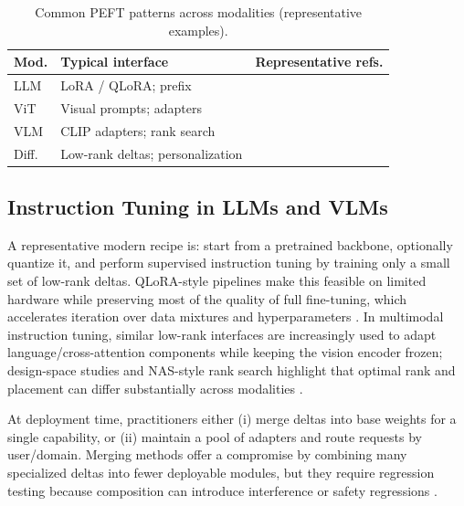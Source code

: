 \documentclass[conference]{IEEEtran}
\begin{document}
\begin{table}[t]
    \centering
    \caption{Common PEFT patterns across modalities (representative examples).}
    \label{tab:peft-modalities}
    \scriptsize
    \setlength{\tabcolsep}{3pt}
    \begin{tabular}{p{0.85cm}p{2.2cm}p{2.4cm}}
        \toprule
        \textbf{Mod.} & \textbf{Typical interface} & \textbf{Representative refs.} \\
        \midrule
        LLM & LoRA / QLoRA; prefix & \cite{hu2021lora,dettmers2023qlora,li2021prefix} \\
        ViT & Visual prompts; adapters & \cite{jia2022visual,chen2022adaptformer} \\
        VLM & CLIP adapters; rank search & \cite{zhang2021tip,radford2021learning,chittyvenkata2025langvision} \\
        Diff. & Low-rank deltas; personalization & \cite{ho2020denoising,rombach2021high,huang2024in} \\
        \bottomrule
    \end{tabular}
\end{table}

\subsection{Instruction Tuning in LLMs and VLMs}
A representative modern recipe is: start from a pretrained backbone, optionally quantize it, and perform supervised instruction tuning by training only a small set of low-rank deltas. QLoRA-style pipelines make this feasible on limited hardware while preserving most of the quality of full fine-tuning, which accelerates iteration over data mixtures and hyperparameters \cite{dettmers2023qlora,hu2021lora}. In multimodal instruction tuning, similar low-rank interfaces are increasingly used to adapt language/cross-attention components while keeping the vision encoder frozen; design-space studies and NAS-style rank search highlight that optimal rank and placement can differ substantially across modalities \cite{jia2022visual,chen2022adaptformer,chittyvenkata2025langvision}.

At deployment time, practitioners either (i) merge deltas into base weights for a single capability, or (ii) maintain a pool of adapters and route requests by user/domain. Merging methods offer a compromise by combining many specialized deltas into fewer deployable modules, but they require regression testing because composition can introduce interference or safety regressions \cite{yadav2023ties,gauthiercaron2024merging,sun2024peftguard}.
\end{document}
